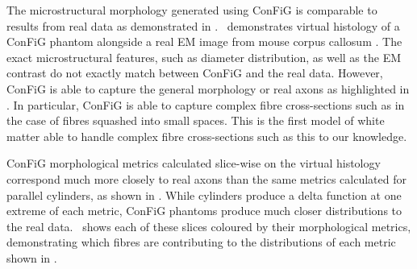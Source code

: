 The microstructural morphology generated using \ac{ConFiG} is comparable to results from real data as demonstrated in .~ demonstrates virtual histology of a \ac{ConFiG} phantom alongside a real \ac{EM} image from mouse corpus callosum \cite{Baxi2015}. The exact microstructural features, such as diameter distribution, as well as the \ac{EM} contrast do not exactly match between \ac{ConFiG} and the real data. However, \ac{ConFiG} is able to capture the general morphology or real axons as highlighted in . In particular, \ac{ConFiG} is able to capture complex fibre cross-sections such as in the case of fibres squashed into small spaces. This is the first model of white matter able to handle complex fibre cross-sections such as this to our knowledge.

\ac{ConFiG} morphological metrics calculated slice-wise on the virtual histology correspond much more closely to real axons than the same metrics calculated for parallel cylinders, as shown in . While cylinders produce a delta function at one extreme of each metric, \ac{ConFiG} phantoms produce much closer distributions to the real data.~ shows each of these slices coloured by their morphological metrics, demonstrating which fibres are contributing to the distributions of each metric shown in .

